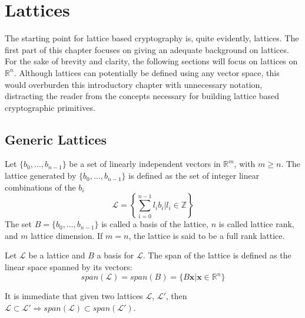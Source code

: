\section{Lattices}

The starting point for lattice based cryptography is, quite evidently, lattices. The first part of this chapter focuses on giving an adequate background on lattices. For the sake of brevity and clarity, the following sections will focus on lattices on $\mathbb{R}^n$. Although lattices can potentially be defined using any vector space, this would overburden this introductory chapter with unnecessary notation, distracting the reader from the concepts necessary for building lattice based cryptographic primitives.

\subsection{Generic Lattices}\label{sec:bg:g_lattice}

\begin{definition}[Lattice]
Let $\{b_0,\ldots,b_{n-1}\}$ be a set of linearly independent vectors in $\mathbb{R}^m$, with $m\geq n$. The lattice generated by $\{b_0,\ldots,b_{n-1}\}$ is defined as the set of integer linear combinations of the $b_i$
\begin{equation*}
\mathscr{L}=\left\{\sum_{i=0}^{n-1}l_ib_i | l_i\in\mathbb{Z}\right\}
\end{equation*}
The set $B=\{b_0,\ldots,b_{n-1}\}$ is called a basis of the lattice, $n$ is called lattice rank, and $m$ lattice dimension. If $m=n$, the lattice is said to be a full rank lattice.
\end{definition}

\begin{definition}
Let $\mathscr{L}$ be a lattice and $B$ a basis for $\mathscr{L}$. The span of the lattice is defined as the linear space spanned by its vectors:
\begin{equation*}
span(\mathscr{L}) = span(B) = \{B\mathbf{x}|\mathbf{x}\in\mathbb{R}^n\}
\end{equation*} 
\end{definition}

\begin{remark}
It is immediate that given two lattices $\mathscr{L}$, $\mathscr{L}'$, then $\mathscr{L}\subset \mathscr{L}' \Rightarrow span(\mathscr{L}) \subset span(\mathscr{L}')$.
\end{remark}

